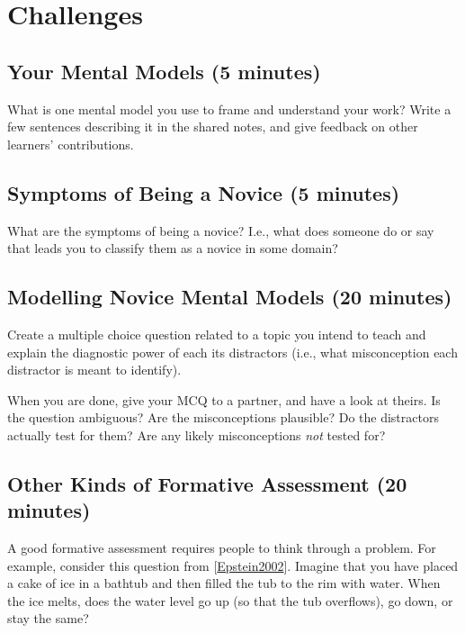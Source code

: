 \documentclass[10pt,statementpaper]{memoir}
\begin{document}
\section{Challenges}\label{challenges-1}

\subsection*{Your Mental Models (5
minutes)}\label{your-mental-models-5-minutes}

What is one mental model you use to frame and understand your work?
Write a few sentences describing it in the shared notes, and give
feedback on other learners' contributions.

\subsection*{Symptoms of Being a Novice (5
minutes)}\label{symptoms-of-being-a-novice-5-minutes}

What are the symptoms of being a novice? I.e., what does someone do or
say that leads you to classify them as a novice in some domain?

\subsection*{Modelling Novice Mental Models (20
minutes)}\label{modelling-novice-mental-models-20-minutes}

Create a multiple choice question related to a topic you intend to teach
and explain the diagnostic power of each its distractors (i.e., what
misconception each distractor is meant to identify).

When you are done, give your MCQ to a partner, and have a look at
theirs. Is the question ambiguous? Are the misconceptions plausible? Do
the distractors actually test for them? Are any likely misconceptions
\emph{not} tested for?

\subsection*{Other Kinds of Formative Assessment (20
minutes)}\label{other-kinds-of-formative-assessment-20-minutes}

A good formative assessment requires people to think through a problem.
For example, consider this question from
{[}\href{biblio.html\#epstein-thinking-physics}{Epstein2002}{]}. Imagine
that you have placed a cake of ice in a bathtub and then filled the tub
to the rim with water. When the ice melts, does the water level go up
(so that the tub overflows), go down, or stay the same?
\end{document}
